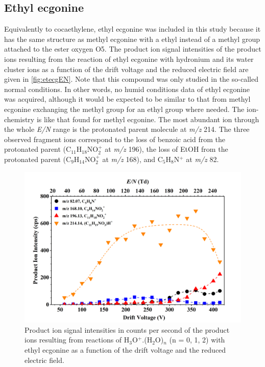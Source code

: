  
 




\subsection{Ethyl ecgonine}

Equivalently to cocaethylene, ethyl ecgonine was included in this study because it has the same structure as methyl ecgonine with a ethyl  instead of a methyl group attached to the ester oxygen O5.
%
The product ion signal intensities of the product ions resulting from the reaction of ethyl ecgonine with hydronium and its water cluster ions as a function of the drift voltage and the reduced electric field are given in \autoref{fig:etecgEN}.
%
Note that this compound was only studied in the so-called normal conditions. In other words, no humid conditions data of ethyl ecgonine was acquired, although it would be expected to be similar to that from methyl ecgonine exchanging the methyl group for an ethyl group where needed.
%
The ion-chemistry is like that found for methyl ecgonine.
%
The most abundant ion through the whole \textit{E/N} range is the protonated parent molecule at \textit{m/z} 214.
%
The three observed fragment ions correspond to
the loss of benzoic acid from the protonated parent (C$_{11}$H$_{18}$NO$_2^+$ at \textit{m/z} 196),
the loss of EtOH from the protonated parent (C$_{9}$H$_{14}$NO$_2^+$ at \textit{m/z} 168),
and C$_5$H$_8$N$^+$ at \textit{m/z} 82.











\begin{figure}[htbp]
\centering
\includegraphics[width=0.8\linewidth]{pics/cocaine-chapter/EtEcg-cps.png}
\caption{Product ion signal intensities in counts per second of the product ions resulting from reactions of H$_3$O$^+$.(H$_2$O)$_n$ (n = 0, 1, 2) with ethyl ecgonine as a function of the drift voltage and the reduced electric field.} 
\label{fig:etecgEN}
\end{figure}


